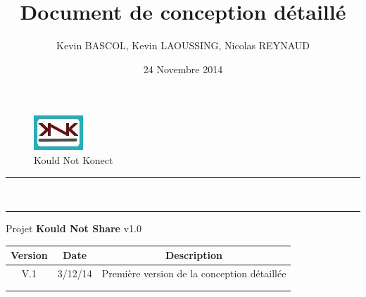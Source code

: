 \documentclass[10pt,a4paper]{report}
\author{Kevin BASCOL, Kevin LAOUSSING, Nicolas REYNAUD}
\title{Document de conception détaillé}
\date{24 Novembre 2014}
\begin{document}
\makeatletter
	\begin{titlepage}
	
	\begin{figure}
		\begin{minipage}[c]{.46\linewidth}
		\end{minipage} \hfill
		\begin{minipage}[c]{.20\linewidth}
			\begin{center}
				\includegraphics{../Logo/logoKNK.jpg}\\
				{\large Kould Not Konect}
			\end{center}
		\end{minipage}
	\vspace{1cm}
	\end{figure}
	
	\centering
		{
		\hrule height 2pt
		\vspace{0.7cm}
		\Huge \textbf{\@title}}\\
		\vspace{0.7cm}
		\hrule height 2pt
		\vspace{1.5cm}
		{\LARGE  Projet \textbf{Kould Not Share} v1.0}
		
		\vfill
		
		\begin{tabular}{|c|c|c|}
			\hline
			Version & Date & Description\\
			\hline
			V.1 & 3/12/14 & Première version de la conception détaillée\\
			\hline
			 & & \\
			\hline
			 & & \\
			\hline
		\end{tabular}\\
		\vspace{1cm}
		\@author\\
		\end{titlepage}
\makeatother
\setcounter{secnumdepth}{5}
\setcounter{tocdepth}{5}
\renewcommand{\contentsname}{Sommaire}
\begingroup\makeatletter
\def\@makeschapterhead#1{%
  {\parindent \z@ \raggedright
    \normalfont
    \interlinepenalty\@M
    \Huge \bfseries  #1\par\nobreak
    \vskip 20pt%
  }}\makeatother
\tableofcontents
\endgroup
\thispagestyle{empty}
\setcounter{page}{0}
\newpage
\end{document}

